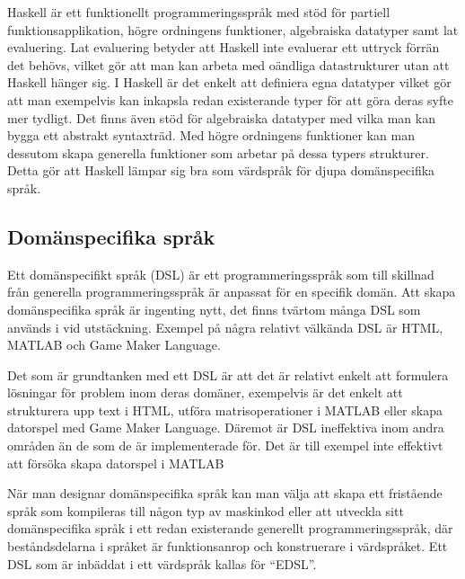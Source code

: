 \documentclass[]{article}
\begin{document}
Haskell är ett funktionellt programmeringsspråk med stöd för partiell
funktionsapplikation, högre ordningens funktioner, algebraiska datatyper
samt lat evaluering. Lat evaluering betyder att Haskell inte
evaluerar ett uttryck förrän det behövs, vilket gör att man kan arbeta
med oändliga datastrukturer utan att Haskell hänger sig. I Haskell är
det enkelt att definiera egna datatyper vilket gör att man exempelvis
kan inkapsla redan existerande typer för att göra deras syfte mer
tydligt. Det finns även stöd för algebraiska datatyper med vilka man kan
bygga ett abstrakt syntaxträd. Med högre ordningens funktioner kan man
dessutom skapa generella funktioner som arbetar på dessa typers
strukturer. Detta gör att Haskell lämpar sig bra som värdspråk för
djupa domänspecifika språk.

\subsection{Domänspecifika språk}
Ett domänspecifikt språk (\gls{DSL}) är ett programmeringsspråk som
till skillnad från generella programmeringsspråk är anpassat för en
specifik domän. Att skapa domänspecifika språk är ingenting nytt, det
finns tvärtom många DSL som används i vid utstäckning.
Exempel på några relativt välkända DSL är HTML, MATLAB och Game Maker
Language.

Det som är grundtanken med ett DSL är att det är relativt enkelt att
formulera lösningar för problem inom deras domäner, exempelvis är det
enkelt att strukturera upp text i HTML, utföra matrisoperationer i
MATLAB eller skapa datorspel med Game Maker Language. Däremot är DSL
ineffektiva inom andra områden än de som de är implementerade för.
Det är till exempel inte effektivt att försöka skapa datorspel i
MATLAB

När man designar domänspecifika språk kan man välja att skapa ett
fristående språk som kompileras till någon typ av maskinkod eller att
utveckla sitt domänspecifika språk i ett redan existerande generellt
programmeringsspråk, där beståndsdelarna i språket är funktionsanrop
och konstruerare i värdspråket. Ett DSL som är inbäddat i ett
värdspråk kallas för ``\gls{EDSL}''.
\end{document}

